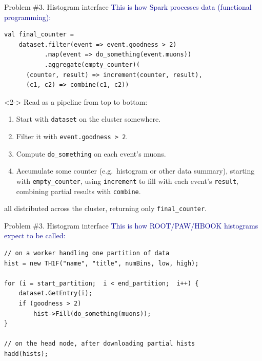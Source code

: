 \documentclass{beamer}
\begin{document}
\begin{frame}[fragile]{Problem \#3. Histogram interface}
\vspace{0.4 cm}
\textcolor{darkblue}{This is how Spark processes data (functional programming):}

\small
\begin{verbatim}
val final_counter =
    dataset.filter(event => event.goodness > 2)
           .map(event => do_something(event.muons))
           .aggregate(empty_counter)(
      (counter, result) => increment(counter, result),
      (c1, c2) => combine(c1, c2))
\end{verbatim}

\begin{uncoverenv}<2->
Read as a pipeline from top to bottom:
\begin{enumerate}\setlength{\itemsep}{-0.1 cm}
\item Start with {\tt\small dataset} on the cluster somewhere.
\item Filter it with {\tt\small event.goodness > 2}.
\item Compute {\tt\small do\_something} on each event's muons.
\item Accumulate some counter (e.g.\ histogram or other data summary), starting with {\tt\small empty\_counter}, using {\tt\small increment} to fill with each event's {\tt\small result}, combining partial results with {\tt\small combine}.
\end{enumerate}
all distributed across the cluster, returning only {\tt\small final\_counter}.
\end{uncoverenv}
\end{frame}

\begin{frame}[fragile]{Problem \#3. Histogram interface}
\vspace{0.4 cm}
\textcolor{darkblue}{This is how ROOT/PAW/HBOOK histograms expect to be called:}

\small
\begin{verbatim}
// on a worker handling one partition of data
hist = new TH1F("name", "title", numBins, low, high);

for (i = start_partition;  i < end_partition;  i++) {
    dataset.GetEntry(i);
    if (goodness > 2)
        hist->Fill(do_something(muons));
}

// on the head node, after downloading partial hists
hadd(hists);
\end{verbatim}
\end{frame}
\end{document}

